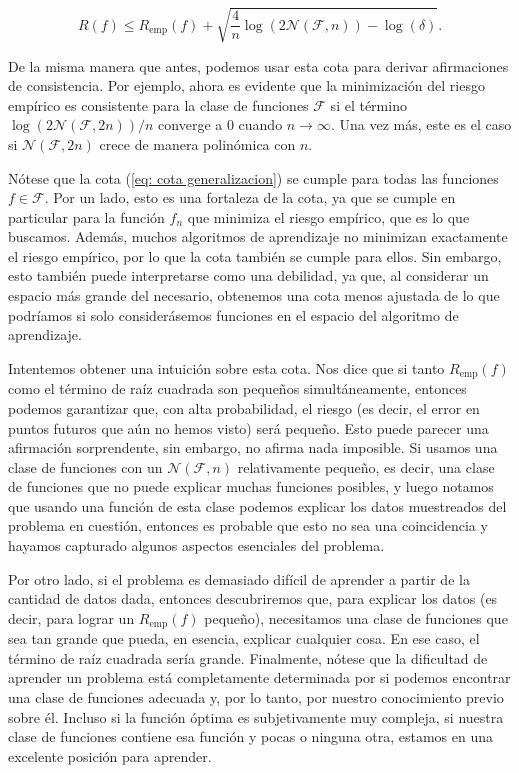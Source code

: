 \documentclass{article}
\begin{document}
\begin{equation}
    R(f) \leq R_{\text{emp}}(f) + \sqrt{\frac{4}{n} \log(2\mathcal{N}(\mathcal{F}, n)) - \log(\delta)}. \label{eq: cota generalizacion}
\end{equation}
\newline

De la misma manera que antes, podemos usar esta cota para derivar afirmaciones de consistencia. Por ejemplo, 
ahora es evidente que la minimización del riesgo empírico es consistente para la clase de funciones \(\mathcal{F}\) 
si el término \(\log(2\mathcal{N}(\mathcal{F}, 2n))/n\) converge a \(0\) cuando \(n \to \infty\). Una vez más, 
este es el caso si \(\mathcal{N}(\mathcal{F}, 2n)\) crece de manera polinómica con \(n\).\newline

Nótese que la cota (\ref{eq: cota generalizacion}) se cumple para todas las funciones \(f \in \mathcal{F}\). 
Por un lado, esto es una fortaleza 
de la cota, ya que se cumple en particular para la función \(f_n\) que minimiza el riesgo empírico, que es lo que 
buscamos. Además, muchos algoritmos de aprendizaje no minimizan exactamente el riesgo empírico, por lo que la cota 
también se cumple para ellos. Sin embargo, esto también puede interpretarse como una debilidad, ya que, al considerar 
un espacio más grande del necesario, obtenemos una cota menos ajustada de lo que podríamos si solo considerásemos
funciones en el espacio del algoritmo de aprendizaje.\newline

Intentemos obtener una intuición sobre esta cota. Nos dice que si tanto \(R_{\text{emp}}(f)\) como el término 
de raíz cuadrada son pequeños simultáneamente, entonces podemos garantizar que, con alta probabilidad, el 
riesgo (es decir, el error en puntos futuros que aún no hemos visto) será pequeño. Esto puede parecer una 
afirmación sorprendente, sin embargo, no afirma nada imposible. Si usamos una clase de funciones con un 
\(\mathcal{N}(\mathcal{F}, n)\) relativamente pequeño, es decir, una clase de funciones que no puede explicar 
muchas funciones posibles, y luego notamos que usando una función de esta clase podemos explicar los datos muestreados 
del problema en cuestión, entonces es probable que esto no sea una coincidencia y hayamos capturado algunos aspectos 
esenciales del problema. \newline

Por otro lado, si el problema es demasiado difícil de aprender a partir de la cantidad de datos dada, entonces 
descubriremos que, para explicar los datos (es decir, para lograr un \(R_{\text{emp}}(f)\) pequeño), necesitamos 
una clase de funciones que sea tan grande que pueda, en esencia, explicar cualquier cosa. En ese caso, el término 
de raíz cuadrada sería grande. Finalmente, nótese que la dificultad de aprender un problema está completamente 
determinada por si podemos encontrar una clase de funciones adecuada y, por lo tanto, por nuestro conocimiento 
previo sobre él. Incluso si la función óptima es subjetivamente muy compleja, si nuestra clase de funciones 
contiene esa función y pocas o ninguna otra, estamos en una excelente posición para aprender.\\
\end{document}
